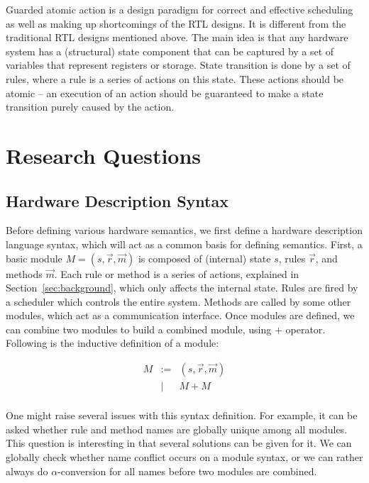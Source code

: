 Guarded atomic action is a design paradigm for correct and effective
scheduling as well as making up shortcomings of the RTL designs. It is
different from the traditional RTL designs mentioned above. The main
idea is that any hardware system has a (structural) state component
that can be captured by a set of variables that represent registers or
storage. State transition is done by a set of rules, where a rule is a
series of actions on this state. These actions should be atomic -- an
execution of an action should be guaranteed to make a state transition
purely caused by the action.

\section{Research Questions}

\subsection{Hardware Description Syntax}

\newcommand{\Mod}{\ensuremath{M}}
\newcommand{\ModC}[3]{\ensuremath{(#1, #2, #3)}}
\newcommand{\ModP}{\ensuremath{+}}
\newcommand{\Sem}[1]{\ensuremath{\llbracket #1 \rrbracket}}

Before defining various hardware semantics, we first define a hardware
description language syntax, which will act as a common basis for
defining semantics. First, a basic module $\Mod{} =
\ModC{s}{\vec{r}}{\vec{m}}$ is composed of (internal) state $s$, rules
$\vec{r}$, and methods $\vec{m}$. Each rule or method is a series of
actions, explained in Section~\ref{sec:background}, which only affects
the internal state. Rules are fired by a scheduler which controls the
entire system. Methods are called by some other modules, which act as
a communication interface. Once modules are defined, we can combine
two modules to build a combined module, using \ModP{}
operator. Following is the inductive definition of a module:

$$\begin{array}{rcl}
  \Mod{} & := & \ModC{s}{\vec{r}}{\vec{m}} \\
  & | & \Mod{} \ModP{} \Mod{} \\
\end{array}$$

One might raise several issues with this syntax definition. For
example, it can be asked whether rule and method names are globally
unique among all modules. This question is interesting in that several
solutions can be given for it. We can globally check whether name
conflict occurs on a module syntax, or we can rather always do
$\alpha$-conversion for all names before two modules are combined.

